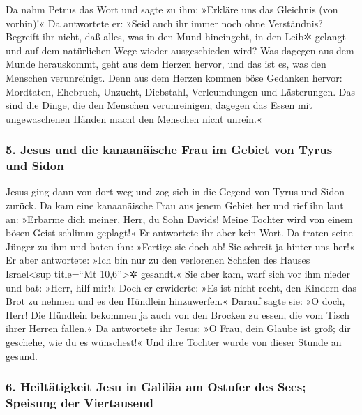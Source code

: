  Da nahm Petrus das Wort und sagte zu ihm: »Erkläre uns
das Gleichnis (von vorhin)!«  Da antwortete er: »Seid
auch ihr immer noch ohne Verständnis?  Begreift ihr
nicht, daß alles, was in den Mund hineingeht, in den Leib✲ gelangt und
auf dem natürlichen Wege wieder ausgeschieden wird?  Was
dagegen aus dem Munde herauskommt, geht aus dem Herzen hervor, und das
ist es, was den Menschen verunreinigt.  Denn aus dem
Herzen kommen böse Gedanken hervor: Mordtaten, Ehebruch, Unzucht,
Diebstahl, Verleumdungen und Lästerungen.  Das sind die
Dinge, die den Menschen verunreinigen; dagegen das Essen mit
ungewaschenen Händen macht den Menschen nicht unrein.«

\hypertarget{jesus-und-die-kanaanuxe4ische-frau-im-gebiet-von-tyrus-und-sidon}{%
\subsubsection{5. Jesus und die kanaanäische Frau im Gebiet von Tyrus
und
Sidon}\label{jesus-und-die-kanaanuxe4ische-frau-im-gebiet-von-tyrus-und-sidon}}

 Jesus ging dann von dort weg und zog sich in die Gegend
von Tyrus und Sidon zurück.  Da kam eine kanaanäische
Frau aus jenem Gebiet her und rief ihn laut an: »Erbarme dich meiner,
Herr, du Sohn Davids! Meine Tochter wird von einem bösen Geist schlimm
geplagt!«  Er antwortete ihr aber kein Wort. Da traten
seine Jünger zu ihm und baten ihn: »Fertige sie doch ab! Sie schreit ja
hinter uns her!«  Er aber antwortete: »Ich bin nur zu den
verlorenen Schafen des Hauses Israel\textless sup title=``Mt
10,6''\textgreater✲ gesandt.«  Sie aber kam, warf sich
vor ihm nieder und bat: »Herr, hilf mir!«  Doch er
erwiderte: »Es ist nicht recht, den Kindern das Brot zu nehmen und es
den Hündlein hinzuwerfen.«  Darauf sagte sie: »O doch,
Herr! Die Hündlein bekommen ja auch von den Brocken zu essen, die vom
Tisch ihrer Herren fallen.«  Da antwortete ihr Jesus: »O
Frau, dein Glaube ist groß; dir geschehe, wie du es wünschest!« Und ihre
Tochter wurde von dieser Stunde an gesund.

\hypertarget{heiltuxe4tigkeit-jesu-in-galiluxe4a-am-ostufer-des-sees-speisung-der-viertausend}{%
\subsubsection{6. Heiltätigkeit Jesu in Galiläa am Ostufer des Sees;
Speisung der
Viertausend}\label{heiltuxe4tigkeit-jesu-in-galiluxe4a-am-ostufer-des-sees-speisung-der-viertausend}}

